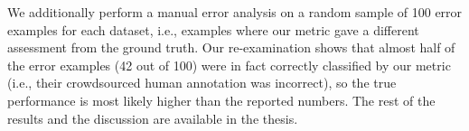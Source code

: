 \documentclass[12pt,notitlepage,a4paper,oneside,openany]{report}
\begin{document}
We additionally perform a manual error analysis on a random sample of 100 error examples for each dataset, i.e., examples where our metric gave a different assessment from the ground truth. Our re-examination shows that almost half of the error examples (42 out of 100) were in fact correctly classified by our metric (i.e., their crowdsourced human annotation was incorrect),  so the true performance is most likely higher than the reported numbers. The rest of the results and the discussion are available in the thesis.




\end{document}
